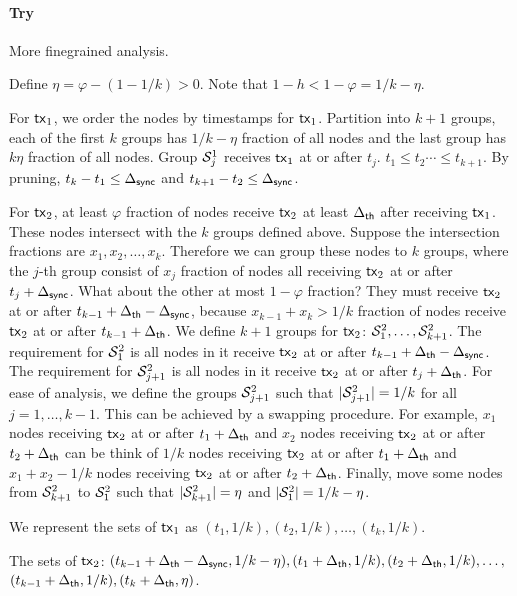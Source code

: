 \paragraph{Try} 

More finegrained analysis. 

Define $\eta = \varphi - (1-1/k)>0$. Note that $1-h< 1-\varphi=1/k-\eta$. 

For $\mathsf{tx}_1$, we order the nodes by timestamps for $\mathsf{tx}_1$. Partition into $k+1$ groups, each of the first $k$ groups has $1/k-\eta$ fraction of all nodes and the last group has $k\eta$ fraction of all nodes. Group $\mathcal{S}^1_j$ receives $\mathsf{tx}_1$ at or after $t_j$. $t_1\le t_2 \cdots \le t_{k+1}$. By pruning, $t_k-t_1 \le \Delta_{\mathsf{sync}}$ and $t_{k+1}-t_2\le \Delta_{\mathsf{sync}}$. 


For $\mathsf{tx}_2$, at least $\varphi$ fraction of nodes receive $\mathsf{tx}_2$ at least $\Delta_{\mathsf{th}}$ after receiving $\mathsf{tx}_1$. These nodes intersect with the $k$ groups defined above. Suppose the intersection fractions are $x_1, x_2,\dots, x_k$. Therefore we can group these nodes to $k$ groups, where the $j$-th group consist of $x_j$ fraction of nodes all receiving $\mathsf{tx}_2$ at or after $t_j+\Delta_{\mathsf{sync}}$. What about the other at most $1-\varphi$ fraction? They must receive $\mathsf{tx}_2$ at or after $t_{k-1}+\Delta_{\mathsf{th}}-\Delta_{\mathsf{sync}}$, because $x_{k-1}+x_{k}>1/k$ fraction of nodes receive $\mathsf{tx}_2$ at or after $t_{k-1}+\Delta_{\mathsf{th}}$. We define $k+1$ groups for $\mathsf{tx}_2$: $\mathcal{S}^{2}_{1}, \dots, \mathcal{S}^{2}_{k+1}$. The requirement for $\mathcal{S}^{2}_1$ is all nodes in it receive $\mathsf{tx}_2$ at or after $t_{k-1}+\Delta_{\mathsf{th}}-\Delta_{\mathsf{sync}}$.  The requirement for $\mathcal{S}^{2}_{j+1}$ is all nodes in it receive $\mathsf{tx}_2$ at or after $t_{j}+\Delta_{\mathsf{th}}$. For ease of analysis, we define the groups $\mathcal{S}^2_{j+1}$ such that $|\mathcal{S}^2_{j+1}|=1/k$ for all $j=1,\dots,k-1$. This can be achieved by a swapping procedure. For example, $x_1$ nodes receiving $\mathsf{tx}_2$ at or after $t_1+\Delta_{\mathsf{th}}$ and $x_2$ nodes receiving $\mathsf{tx}_2$ at or after $t_2+\Delta_{\mathsf{th}}$ can be think of $1/k$ nodes receiving $\mathsf{tx}_2$ at or after $t_1+\Delta_{\mathsf{th}}$ and $x_1+x_2-1/k$ nodes receiving $\mathsf{tx}_2$ at or after $t_2+\Delta_{\mathsf{th}}$. Finally, move some nodes from $\mathcal{S}^2_{k+1}$ to $\mathcal{S}^2_{1}$ such that $|\mathcal{S}^2_{k+1}|=\eta$ and $|\mathcal{S}^2_{1}|=1/k-\eta$. 

We represent the sets of $\mathsf{tx}_1$ as $(t_1, 1/k), (t_2, 1/k), \dots, (t_k, 1/k)$. 

The sets of $\mathsf{tx}_2$: $(t_{k-1}+\Delta_{\mathsf{th}}-\Delta_{\mathsf{sync}}, 1/k-\eta), (t_1+\Delta_{\mathsf{th}}, 1/k), (t_2+\Delta_{\mathsf{th}}, 1/k), \dots,$ $(t_{k-1}+\Delta_{\mathsf{th}}, 1/k), (t_k+\Delta_{\mathsf{th}}, \eta)$. 

